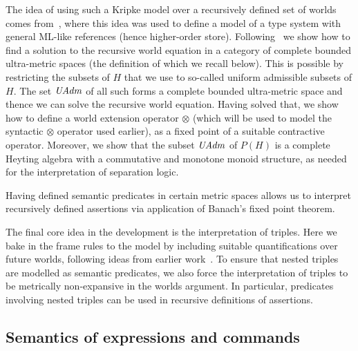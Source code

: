 \documentclass{LMCS}
\theoremstyle{remark}
\begin{document}
The idea of using such a Kripke model over a recursively defined set
of worlds comes from~\cite{Birkedal:Stovring:Thamsborg:09}, where this
idea was used to define a model of a type system with general ML-like
references (hence higher-order store). Following~\cite{Birkedal:Stovring:Thamsborg:09} we show how to
find a solution to the recursive world equation in a category of
complete bounded ultra-metric spaces (the definition of which we
recall below). This is possible by restricting the subsets of $H$ that
we use to so-called uniform admissible subsets of $H$. The set $\mathit{UAdm}$
of all such forms a complete bounded ultra-metric space and thence we
can solve the recursive world equation.  Having solved that, we show how
to define a world extension operator $\otimes$ (which will be used to model
the syntactic $\otimes$ operator used earlier), as a fixed point of a suitable contractive
operator. 
Moreover, we show that the subset $\mathit{UAdm}$ of $P(H)$ is a complete Heyting algebra with a commutative and monotone monoid structure, 
as needed for the interpretation of separation logic. 

Having defined semantic predicates in certain metric spaces allows us
to interpret recursively defined assertions via application of
Banach's fixed point theorem.

The final core idea in the development is the interpretation of
triples. Here we bake in the frame rules to the model by including
suitable quantifications over future worlds, following ideas from
earlier work~\cite{Birkedal:Reus:Schwinghammer:Yang:08}. To ensure
that nested triples are modelled as semantic predicates, we also force
the interpretation of triples to be metrically non-expansive in the worlds
argument. In particular,    predicates involving nested triples can be used
in recursive definitions of assertions. 


\subsection{Semantics of expressions and commands}
\label{subsec:semantics_exp_com}
\end{document}
